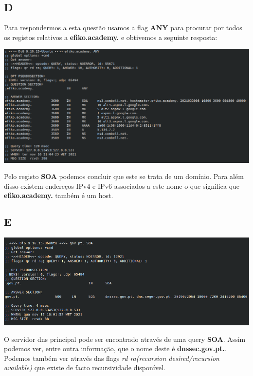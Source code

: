 \documentclass[size=11pt]{report}
\begin{document}
        \subsection*{D}
                Para respondermos a esta questão usamos a flag \textbf{ANY} para procurar por todos os registos relativos a \textbf{efiko.academy.} e obtivemos a seguinte resposta:

            \vspace{0.45em}
            \noindent
            \includegraphics[width=\textwidth]{images/dig_efiko.png}
            \par

            \vspace{0.45em}
                Pelo registo \textbf{SOA} podemos concluir que este se trata de um domínio.
                Para além disso existem endereços IPv4 e IPv6 associados a este nome o que significa que \textbf{efiko.academy.} também é um host.
        \subsection*{E}
            \noindent
            \includegraphics[width=\textwidth]{images/dig_gov_soa.png}
            \par
            
            O servidor dns principal pode ser encontrado através de uma query \textbf{SOA}.
            Assim podemos ver, entre outra informação, que o nome deste é \textbf{dnssec.gov.pt.}. Podemos também ver através das flags \textit{rd ra(recursion desired/recursion available)} que existe de facto recursividade disponível.
\end{document}
